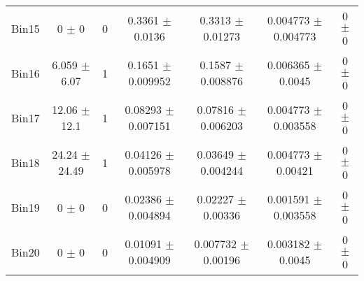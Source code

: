 \begin{tabular}{@{\extracolsep{4pt}}lcccccc@{}}
     Bin15 & 0 $\pm$ 0 & 0 & 0.3361 $\pm$ 0.0136 & 0.3313 $\pm$ 0.01273 & 0.004773 $\pm$ 0.004773 & 0 $\pm$ 0 \\ 
     Bin16 & 6.059 $\pm$ 6.07 & 1 & 0.1651 $\pm$ 0.009952 & 0.1587 $\pm$ 0.008876 & 0.006365 $\pm$ 0.0045 & 0 $\pm$ 0 \\ 
     Bin17 & 12.06 $\pm$ 12.1 & 1 & 0.08293 $\pm$ 0.007151 & 0.07816 $\pm$ 0.006203 & 0.004773 $\pm$ 0.003558 & 0 $\pm$ 0 \\ 
     Bin18 & 24.24 $\pm$ 24.49 & 1 & 0.04126 $\pm$ 0.005978 & 0.03649 $\pm$ 0.004244 & 0.004773 $\pm$ 0.00421 & 0 $\pm$ 0 \\ 
     Bin19 & 0 $\pm$ 0 & 0 & 0.02386 $\pm$ 0.004894 & 0.02227 $\pm$ 0.00336 & 0.001591 $\pm$ 0.003558 & 0 $\pm$ 0 \\ 
     Bin20 & 0 $\pm$ 0 & 0 & 0.01091 $\pm$ 0.004909 & 0.007732 $\pm$ 0.00196 & 0.003182 $\pm$ 0.0045 & 0 $\pm$ 0 \\ 
\hline\hline
  \end{tabular}
